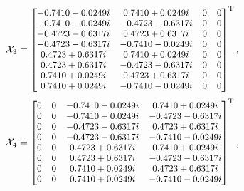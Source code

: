 \documentclass[journal]{IEEEtran}
\begin{document}
 \begin{equation}
  \footnotesize   
     \mathcal X_3=
\begin{bmatrix}
    -0.7410 - 0.0249i    &     0.7410 + 0.0249i    &     0    &     0\\
  -0.7410 - 0.0249i    &    -0.4723 - 0.6317i    &     0    &     0\\
  -0.4723 - 0.6317i    &     0.4723 + 0.6317i    &     0    &     0\\
  -0.4723 - 0.6317i    &    -0.7410 - 0.0249i    &     0    &     0\\
   0.4723 + 0.6317i    &     0.7410 + 0.0249i    &     0    &     0\\
   0.4723 + 0.6317i    &    -0.4723 - 0.6317i    &     0    &     0\\
   0.7410 + 0.0249i    &     0.4723 + 0.6317i    &     0    &     0\\
   0.7410 + 0.0249i    &    -0.7410 - 0.0249i    &     0    &     0\\
      \end{bmatrix}^{\text{T}}, \notag
  \end{equation}
\begin{equation}
  \footnotesize   
     \mathcal X_4=
\begin{bmatrix}
  
   0    &     0    &    -0.7410 - 0.0249i    &     0.7410 + 0.0249i\\
   0    &     0    &    -0.7410 - 0.0249i    &    -0.4723 - 0.6317i\\
   0    &     0    &    -0.4723 - 0.6317i    &     0.4723 + 0.6317i\\
   0    &     0    &    -0.4723 - 0.6317i    &    -0.7410 - 0.0249i\\
   0    &     0    &     0.4723 + 0.6317i    &     0.7410 + 0.0249i\\
   0    &     0    &     0.4723 + 0.6317i    &    -0.4723 - 0.6317i\\
   0    &     0    &     0.7410 + 0.0249i    &     0.4723 + 0.6317i\\
   0    &     0    &     0.7410 + 0.0249i    &    -0.7410 - 0.0249i\\
      \end{bmatrix}^{\text{T}}, \notag
  \end{equation}
\end{document}
